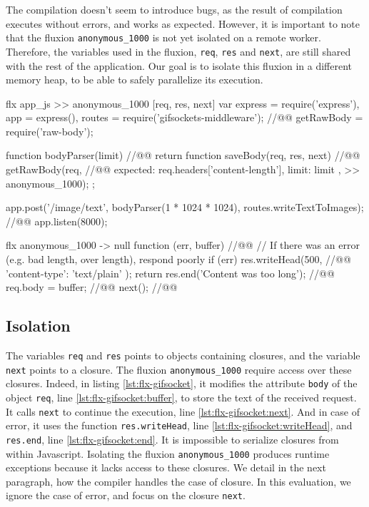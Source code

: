 The compilation doesn't seem to introduce bugs, as the result of compilation executes without errors, and works as expected.
However, it is important to note that the fluxion \texttt{anonymous\_1000} is not yet isolated on a remote worker.
Therefore, the variables used in the fluxion, \texttt{req}, \texttt{res} and \texttt{next}, are still shared with the rest of the application.
Our goal is to isolate this fluxion in a different memory heap, to be able to safely parallelize its execution.

\begin{code}[flx, caption={Compilation result of the simplified version of gifsockets-server},label={lst:flx-gifsocket}]
flx app_js
>> anonymous_1000 [req, res, next]
  var express = require('express'),
      app = express(),
      routes = require('gifsockets-middleware'); //@\label{lst:flx-gifsocket:gif-mw}@
      getRawBody = require('raw-body');

  function bodyParser(limit) { //@\label{lst:flx-gifsocket:bodyParser}@
    return function saveBody(req, res, next) { //@\label{lst:flx-gifsocket:saveBody}@
      getRawBody(req, { //@\label{lst:flx-gifsocket:getRawBody}@
        expected: req.headers['content-length'],
        limit: limit
      }, >> anonymous_1000);
    };
  }

  app.post('/image/text', bodyParser(1 * 1024 * 1024), routes.writeTextToImages); //@\label{lst:flx-gifsocket:app.post}@
  app.listen(8000);

flx anonymous_1000
-> null
  function (err, buffer) { //@\label{lst:flx-gifsocket:callback}@
    // If there was an error (e.g. bad length, over length), respond poorly
    if (err) {
      res.writeHead(500, { //@\label{lst:flx-gifsocket:writeHead}@
        'content-type': 'text/plain'
      });
      return res.end('Content was too long');  //@\label{lst:flx-gifsocket:end}@
    }
    req.body = buffer; //@\label{lst:flx-gifsocket:buffer}@
    next(); //@\label{lst:flx-gifsocket:next}@
  }
\end{code}

\subsection{Isolation}

The variables \texttt{req} and \texttt{res} points to objects containing closures, and the variable \texttt{next} points to a closure.
The fluxion \texttt{anonymous\_1000} require access over these closures.
Indeed, in listing \ref{lst:flx-gifsocket}, it modifies the attribute \texttt{body} of the object \texttt{req}, line \ref{lst:flx-gifsocket:buffer}, to store the text of the received request.
It calls \texttt{next} to continue the execution, line \ref{lst:flx-gifsocket:next}.
And in case of error, it uses the function \texttt{res.writeHead}, line \ref{lst:flx-gifsocket:writeHead}, and \texttt{res.end}, line \ref{lst:flx-gifsocket:end}.
It is impossible to serialize closures from within Javascript.
Isolating the fluxion \texttt{anonymous\_1000} produces runtime exceptions because it lacks access to these closures.
We detail in the next paragraph, how the compiler handles the case of closure.
In this evaluation, we ignore the case of error, and focus on the closure \texttt{next}.

